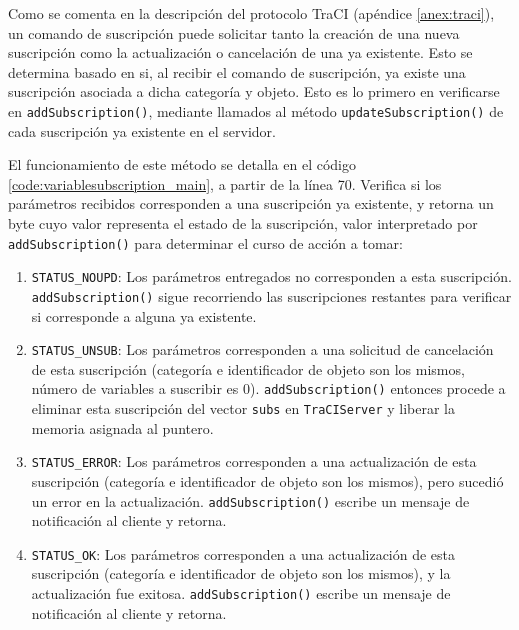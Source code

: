 Como se comenta en la descripción del protocolo TraCI (apéndice \ref{anex:traci}), un comando de suscripción puede solicitar tanto la creación de una nueva suscripción como la actualización o cancelación de una ya existente. Esto se determina basado en si, al recibir el comando de suscripción, ya existe una suscripción asociada a dicha categoría y objeto. Esto es lo primero en verificarse en \texttt{addSubscription()}, mediante llamados al método \texttt{updateSubscription()} de cada suscripción ya existente en el servidor.

El funcionamiento de este método se detalla en el código \ref{code:variablesubscription_main}, a partir de la línea 70. Verifica si los parámetros recibidos corresponden a una suscripción ya existente, y retorna un byte cuyo valor representa el estado de la suscripción, valor interpretado por \texttt{addSubscription()} para determinar el curso de acción a tomar:
\begin{enumerate}
    \item \texttt{STATUS\_NOUPD}: Los parámetros entregados no corresponden a esta suscripción. \texttt{addSubscription()} sigue recorriendo las suscripciones restantes para verificar si corresponde a alguna ya existente.
    \item \texttt{STATUS\_UNSUB}: Los parámetros corresponden a una solicitud de cancelación de esta suscripción (categoría e identificador de objeto son los mismos, número de variables a suscribir es $0$). \texttt{addSubscription()} entonces procede a eliminar esta suscripción del vector \texttt{subs} en \texttt{TraCIServer} y liberar la memoria asignada al puntero.
    \item \texttt{STATUS\_ERROR}: Los parámetros corresponden a una actualización de esta suscripción (categoría e identificador de objeto son los mismos), pero sucedió un error en la actualización. \texttt{addSubscription()} escribe un mensaje de notificación al cliente y retorna.
    \item \texttt{STATUS\_OK}: Los parámetros corresponden a una actualización de esta suscripción (categoría e identificador de objeto son los mismos), y la actualización fue exitosa. \texttt{addSubscription()} escribe un mensaje de notificación al cliente y retorna.
\end{enumerate}



